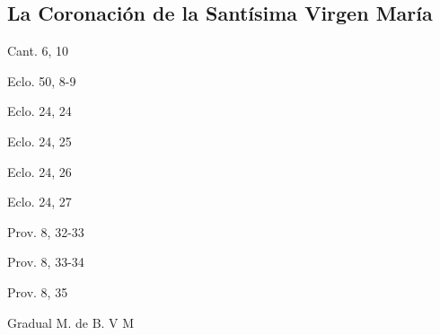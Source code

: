 \documentclass[a4paper,11pt]{article}
\begin{document}
    \subsection*{\hfil La Coronación de la Santísima Virgen María \hfil}
      \begin{flushright}
        Cant. 6, 10
      \end{flushright}      
      \begin{flushright}
        Eclo. 50, 8-9
      \end{flushright}      
      \begin{flushright}
        Eclo. 24, 24
      \end{flushright}      
      \begin{flushright}
        Eclo. 24, 25
      \end{flushright}      
      \begin{flushright}
        Eclo. 24, 26
      \end{flushright}      
      \begin{flushright}
        Eclo. 24, 27
      \end{flushright}      
      \begin{flushright}
        Prov. 8, 32-33
      \end{flushright}      
      \begin{flushright}
        Prov. 8, 33-34
      \end{flushright}      
      \begin{flushright}
        Prov. 8, 35
      \end{flushright}      
      \begin{flushright}
        Gradual M. de B. V M
      \end{flushright}
\end{document}
